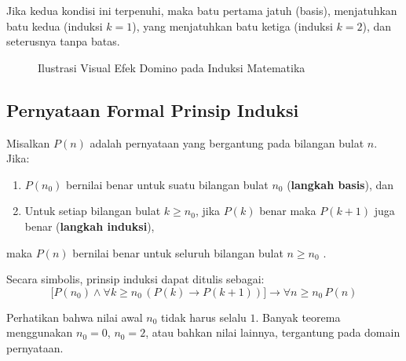 Jika kedua kondisi ini terpenuhi, maka batu pertama jatuh (basis), menjatuhkan batu kedua (induksi $k=1$), yang menjatuhkan batu ketiga (induksi $k=2$), dan seterusnya tanpa batas.

\begin{figure}[htbp]
\centering
{}
\caption{Ilustrasi Visual Efek Domino pada Induksi Matematika}
\label{fig:domino-induksi}
\end{figure}

\subsection{Pernyataan Formal Prinsip Induksi}

\begin{definisi}
Misalkan $P(n)$ adalah pernyataan yang bergantung pada bilangan bulat $n$. Jika:
\begin{enumerate}
    \item $P(n_0)$ bernilai benar untuk suatu bilangan bulat $n_0$ (\textbf{langkah basis}), dan
    \item Untuk setiap bilangan bulat $k \geq n_0$, jika $P(k)$ benar maka $P(k+1)$ juga benar (\textbf{langkah induksi}),
\end{enumerate}
maka $P(n)$ bernilai benar untuk seluruh bilangan bulat $n \geq n_0$ \cite{wiki_mathematical_induction}.
\end{definisi}

Secara simbolis, prinsip induksi dapat ditulis sebagai:
\[ \Big[ P(n_0) \wedge \forall k \geq n_0\, (P(k) \rightarrow P(k+1)) \Big] \rightarrow \forall n \geq n_0\, P(n) \]

Perhatikan bahwa nilai awal $n_0$ tidak harus selalu $1$. Banyak teorema menggunakan $n_0 = 0$, $n_0 = 2$, atau bahkan nilai lainnya, tergantung pada domain pernyataan.
